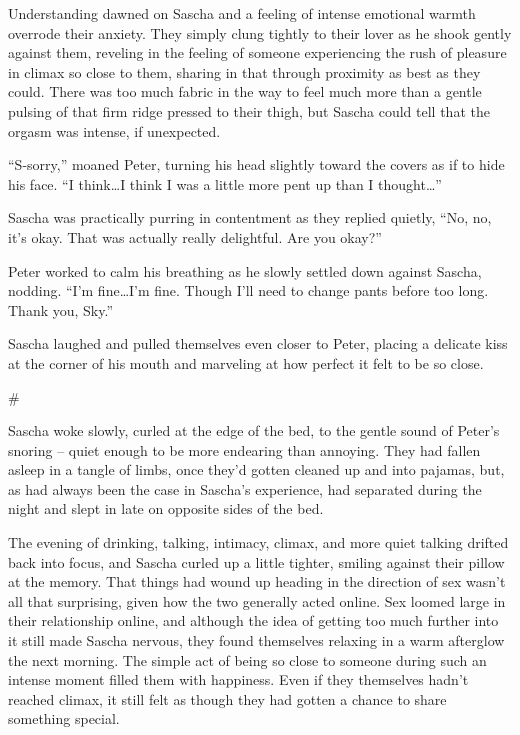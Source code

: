 \documentclass[12pt,letterpaper,oneside]{memoir}
\newcommand\secdiv{
  \begin{center}
    \#
  \end{center}
}
\begin{document}
  Understanding dawned on Sascha and a feeling of intense emotional warmth overrode their anxiety. They simply clung tightly to their lover as he shook gently against them, reveling in the feeling of someone experiencing the rush of pleasure in climax so close to them, sharing in that through proximity as best as they could. There was too much fabric in the way to feel much more than a gentle pulsing of that firm ridge pressed to their thigh, but Sascha could tell that the orgasm was intense, if unexpected.

  ``S-sorry,'' moaned Peter, turning his head slightly toward the covers as if to hide his face. ``I think\ldots{}I think I was a little more pent up than I thought\ldots{}''

  Sascha was practically purring in contentment as they replied quietly, ``No, no, it's okay. That was actually really delightful. Are you okay?''

  Peter worked to calm his breathing as he slowly settled down against Sascha, nodding. ``I'm fine\ldots{}I'm fine. Though I'll need to change pants before too long. Thank you, Sky.''

  Sascha laughed and pulled themselves even closer to Peter, placing a delicate kiss at the corner of his mouth and marveling at how perfect it felt to be so close.

  \secdiv

  Sascha woke slowly, curled at the edge of the bed, to the gentle sound of Peter's snoring -- quiet enough to be more endearing than annoying. They had fallen asleep in a tangle of limbs, once they'd gotten cleaned up and into pajamas, but, as had always been the case in Sascha's experience, had separated during the night and slept in late on opposite sides of the bed.

  The evening of drinking, talking, intimacy, climax, and more quiet talking drifted back into focus, and Sascha curled up a little tighter, smiling against their pillow at the memory. That things had wound up heading in the direction of sex wasn't all that surprising, given how the two generally acted online. Sex loomed large in their relationship online, and although the idea of getting too much further into it still made Sascha nervous, they found themselves relaxing in a warm afterglow the next morning. The simple act of being so close to someone during such an intense moment filled them with happiness. Even if they themselves hadn't reached climax, it still felt as though they had gotten a chance to share something special.
\end{document}
